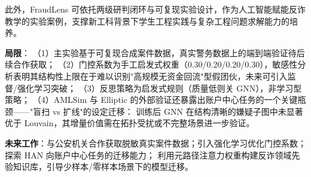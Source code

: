 \documentclass[12pt,a4paper]{ctexart}
\begin{document}
此外，FraudLens 可依托两级研判闭环与可复现实验设计，作为人工智能赋能反诈教学的实验案例，支撑新工科背景下学生工程实践与复杂工程问题求解能力的培养。

\textbf{局限}：
（1）主实验基于可复现合成案件数据，真实警务数据上的端到端验证待后续合作获取；
（2）门控系数为手工启发式权重（0.30/0.20/0.20/0.30），敏感性分析表明其结构性上限在于难以识别"高规模无资金回流"型假团伙，未来可引入监督/强化学习突破；
（3）反思策略为启发式规则（质量低则关 GNN），非学习型策略；
（4）AMLSim 与 Elliptic 的外部验证还暴露出账户中心任务的一个关键瓶颈——"盲扫 vs 扩线"的设定迁移：
训练后 GNN 在结构清晰的嫌疑子图中未显著优于 Louvain，其增量价值需在拓扑受扰或不完整场景进一步验证。

\textbf{未来工作}：与公安机关合作获取脱敏真实案件数据；引入强化学习优化门控系数；
探索 HAN 向账户中心任务的迁移能力；
利用元路径注意力权重构建反诈领域先验知识库，引导少样本/零样本场景下的模型迁移。



\end{document}
